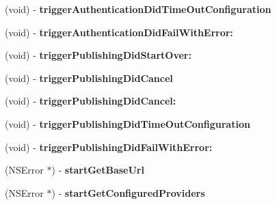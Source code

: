 \begin{DoxyCompactItemize}
\item 
\hypertarget{interface_j_r_session_data_a90c331233a758a636f159af5c7e2b836}{
(void) -\/ {\bfseries triggerAuthenticationDidTimeOutConfiguration}}
\label{interface_j_r_session_data_a90c331233a758a636f159af5c7e2b836}

\item 
\hypertarget{interface_j_r_session_data_ab04664bb3131bd586bf5d218cedc4a73}{
(void) -\/ {\bfseries triggerAuthenticationDidFailWithError:}}
\label{interface_j_r_session_data_ab04664bb3131bd586bf5d218cedc4a73}

\item 
\hypertarget{interface_j_r_session_data_a0ca2bee556ece44859480f6f39044797}{
(void) -\/ {\bfseries triggerPublishingDidStartOver:}}
\label{interface_j_r_session_data_a0ca2bee556ece44859480f6f39044797}

\item 
\hypertarget{interface_j_r_session_data_a6864515aacf6c1eb9a0a45ce1321ac3a}{
(void) -\/ {\bfseries triggerPublishingDidCancel}}
\label{interface_j_r_session_data_a6864515aacf6c1eb9a0a45ce1321ac3a}

\item 
\hypertarget{interface_j_r_session_data_a71d52b6f2f0b56562d3c834c2becc7cc}{
(void) -\/ {\bfseries triggerPublishingDidCancel:}}
\label{interface_j_r_session_data_a71d52b6f2f0b56562d3c834c2becc7cc}

\item 
\hypertarget{interface_j_r_session_data_a637bcb8baecb13a91fae90c98e9edea8}{
(void) -\/ {\bfseries triggerPublishingDidTimeOutConfiguration}}
\label{interface_j_r_session_data_a637bcb8baecb13a91fae90c98e9edea8}

\item 
\hypertarget{interface_j_r_session_data_ac5100a6af9adcf8d8a4108346817b0bf}{
(void) -\/ {\bfseries triggerPublishingDidFailWithError:}}
\label{interface_j_r_session_data_ac5100a6af9adcf8d8a4108346817b0bf}

\item 
\hypertarget{interface_j_r_session_data_aba6010c7fb6a2c0bbd016b7a6b96c73b}{
(NSError $\ast$) -\/ {\bfseries startGetBaseUrl}}
\label{interface_j_r_session_data_aba6010c7fb6a2c0bbd016b7a6b96c73b}

\item 
\hypertarget{interface_j_r_session_data_a53d27e9998083d54fd9adce465e8be8e}{
(NSError $\ast$) -\/ {\bfseries startGetConfiguredProviders}}
\label{interface_j_r_session_data_a53d27e9998083d54fd9adce465e8be8e}


\end{DoxyCompactItemize}
